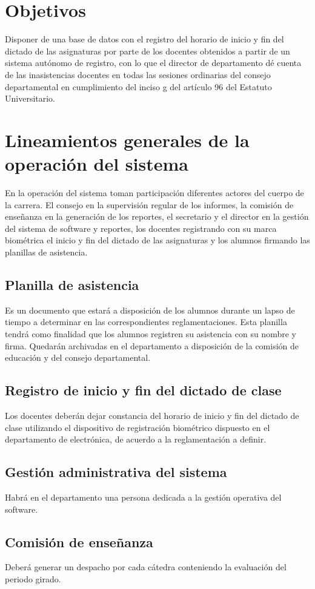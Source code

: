 \documentclass[a4paper, 11pt]{article} %
\begin{document}
\section*{Objetivos}
Disponer de una base de datos con el registro del horario de inicio y fin del dictado de las asignaturas por parte de los docentes obtenidos a partir de un sistema autónomo de registro, con lo que el director de departamento dé cuenta de las inasistencias docentes en todas las sesiones ordinarias del consejo departamental en cumplimiento del inciso g del artículo 96 del Estatuto Universitario. 
\section*{Lineamientos generales de la operación del sistema}
En la operación del sistema toman participación diferentes actores del cuerpo de la carrera. El consejo en la supervisión regular de los informes, la comisión de enseñanza en la generación de los reportes, el secretario y el director en la gestión del sistema de software y reportes, los docentes registrando con su marca biométrica el inicio y fin del dictado de las asignaturas y los alumnos firmando las planillas de asistencia.
\subsection*{Planilla de asistencia}
Es un documento que estará a disposición de los alumnos durante un lapso de tiempo a determinar en las correspondientes reglamentaciones. Esta planilla tendrá como finalidad que los alumnos registren su asistencia con su nombre y firma. Quedarán archivadas en el departamento a disposición de la comisión de educación y del consejo departamental.
\subsection*{Registro de inicio y fin del dictado de clase}
Los docentes deberán dejar constancia del horario de inicio y fin del dictado de clase utilizando el dispositivo de registración biométrico dispuesto en el departamento de electrónica, de acuerdo a la reglamentación a definir.\\

\subsection*{Gestión administrativa del sistema}
Habrá en el departamento una persona dedicada a la gestión operativa del software.
\subsection*{Comisión de enseñanza}
Deberá generar un despacho por cada cátedra conteniendo la evaluación del periodo girado.
\end{document}
